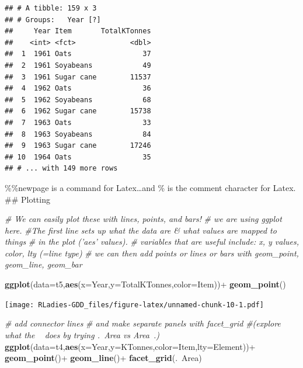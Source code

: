 \documentclass[]{article}
\newenvironment{Shaded}{\begin{snugshade}}{\end{snugshade}}
\newcommand{\KeywordTok}[1]{\textcolor[rgb]{0.13,0.29,0.53}{\textbf{{#1}}}}
\newcommand{\DataTypeTok}[1]{\textcolor[rgb]{0.13,0.29,0.53}{{#1}}}
\newcommand{\StringTok}[1]{\textcolor[rgb]{0.31,0.60,0.02}{{#1}}}
\newcommand{\CommentTok}[1]{\textcolor[rgb]{0.56,0.35,0.01}{\textit{{#1}}}}
\newcommand{\NormalTok}[1]{{#1}}
\begin{document}
\begin{verbatim}
## # A tibble: 159 x 3
## # Groups:   Year [?]
##     Year Item       TotalKTonnes
##    <int> <fct>             <dbl>
##  1  1961 Oats                 37
##  2  1961 Soyabeans            49
##  3  1961 Sugar cane        11537
##  4  1962 Oats                 36
##  5  1962 Soyabeans            68
##  6  1962 Sugar cane        15738
##  7  1963 Oats                 33
##  8  1963 Soyabeans            84
##  9  1963 Sugar cane        17246
## 10  1964 Oats                 35
## # ... with 149 more rows
\end{verbatim}

\newpage 

\%\%newpage is a command for Latex\ldots{}and \% is the comment
character for Latex. \#\# Plotting

\begin{Shaded}
\begin{Highlighting}[]
\CommentTok{# We can easily plot these with lines, points, and bars!}
\CommentTok{# we are using ggplot here. }
\CommentTok{#The first line sets up what the data are & what values are mapped to things}
\CommentTok{# in the plot ('aes' values).}
\CommentTok{# variables that are useful include: x, y values, color, lty (=line type)}
\CommentTok{# we can then add points or lines or bars with geom_point, geom_line, geom_bar}

\KeywordTok{ggplot}\NormalTok{(}\DataTypeTok{data=}\NormalTok{t5,}\KeywordTok{aes}\NormalTok{(}\DataTypeTok{x=}\NormalTok{Year,}\DataTypeTok{y=}\NormalTok{TotalKTonnes,}\DataTypeTok{color=}\NormalTok{Item))+}
\StringTok{  }\KeywordTok{geom_point}\NormalTok{()}
\end{Highlighting}
\end{Shaded}

\texttt{[image: RLadies-GDD\_files/figure-latex/unnamed-chunk-10-1.pdf]}
\newpage

\begin{Shaded}
\begin{Highlighting}[]
\CommentTok{# add connector lines}
\CommentTok{# and make separate panels with facet_grid }
\CommentTok{#(explore what the ~ does by trying .~Area vs Area~.)}
\KeywordTok{ggplot}\NormalTok{(}\DataTypeTok{data=}\NormalTok{t4,}\KeywordTok{aes}\NormalTok{(}\DataTypeTok{x=}\NormalTok{Year,}\DataTypeTok{y=}\NormalTok{KTonnes,}\DataTypeTok{color=}\NormalTok{Item,}\DataTypeTok{lty=}\NormalTok{Element))+}
\StringTok{  }\KeywordTok{geom_point}\NormalTok{()+}
\StringTok{  }\KeywordTok{geom_line}\NormalTok{()+}
\StringTok{  }\KeywordTok{facet_grid}\NormalTok{(.~Area)}
\end{Highlighting}
\end{Shaded}
\end{document}
